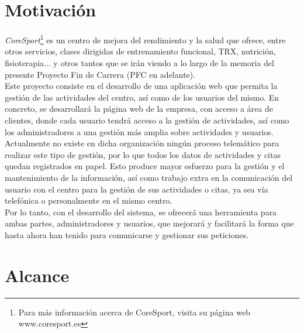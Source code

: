


\section{Motivación}

\textsl{CoreSport}\footnote{Para más información acerca de CoreSport, visita su página web www.coresport.es} es un centro de mejora del rendimiento y la salud que ofrece, entre otros servicios, clases dirigidas de entrenamiento funcional, TRX, nutrición, fisioterapia... y otros tantos que se irán viendo a lo largo de la memoria del presente Proyecto Fin de Carrera (PFC en adelante).
\\
Este proyecto consiste en el desarrollo de una aplicación web que permita la gestión de las actividades del centro, así como de los usuarios del mismo. En concreto, se desarrollará la página web de la empresa, con acceso a área de clientes, donde cada usuario tendrá acceso a la gestión de actividades, así como los administradores a una gestión más amplia sobre actividades y usuarios. 
\\

Actualmente no existe en dicha organización ningún proceso telemático para realizar este tipo de gestión, por lo que todos los datos de actividades y citas quedan registrados en papel. Esto produce mayor esfuerzo para la gestión y el mantenimiento de la información, así como trabajo extra en la comunicación del usuario con el centro para la gestión de sus actividades o citas, ya sea vía telefónica o personalmente en el mismo centro.
\\

Por lo tanto, con el desarrollo del sistema, se ofrecerá una herramienta para ambas partes, administradores y usuarios, que mejorará y facilitará la forma que hasta ahora han tenido para comunicarse y gestionar sus peticiones.


\section{Alcance} 

